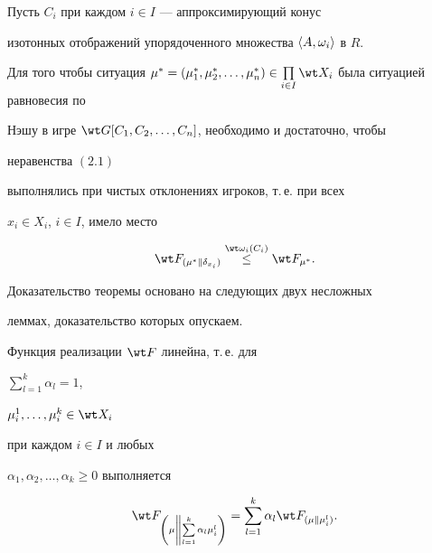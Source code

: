 \begin{thms} 


Пусть $C_i$ при каждом $i\in I$ --- аппроксимирующий конус 


изотонных отображений упорядоченного множества $\langle A,\omega_i\rangle$ в $R$. 


Для того чтобы ситуация $\mu^*=(\mu^*_1,\mu^*_2,\dotsc,\mu^*_n)\in 


\prod\limits_{i\in I}\wt X_i$ была ситуацией равновесия по 


Нэшу в игре $\wt G[C_1,C_2,\dotsc,C_n]$, необходимо и достаточно, чтобы 


неравенства $(2.1)$ 


выполнялись при чистых отклонениях игроков, т.\,е. при всех 


$x_i\in X_i$, $i\in I$,  имело место 


\begin{equation} 


\wt F_{(\mu^*\|\delta_{x_i})}\up{\wt\omega_i(C_i)}{\le}\wt F_{\mu^*}. 


\end{equation} 


\end{thms} 


 


Доказательство теоремы основано на следующих двух несложных 


леммах, доказательство которых опускаем. 


 


\begin{lems} 


Функция реализации $\wt F$ линейна, т.\,е. для


$\sum\limits^k_{l=1}\alpha_l=1$, 


$\mu^1_i,\dotsc,\mu^k_i\in\wt X_i$ 


при каждом $i\in I$ и любых 


$\alpha_1,\alpha_2,\dotsc,\alpha_k\ge0$ выполняется 


$$ 


\wt 


F_{\left(\mu\left\|\sum\limits^k_{l=1}\right.\alpha_l\mu^l_i\right)} 


=\sum^k_{l=1}\alpha_l\wt F_{(\mu\|\mu^l_i)}. 


$$ 


\end{lems} 


